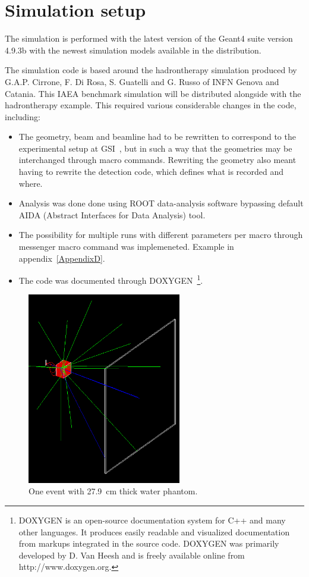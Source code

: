 \section{Simulation setup\label{SimulationSetup}} %
The simulation is performed with the latest version of the Geant4 suite version 4.9.3b with the newest simulation models available in the distribution.

The simulation code is based around the hadrontherapy simulation produced by G.A.P. Cirrone, F. Di Rosa, S. Guatelli and  G. Russo of INFN Genova and Catania. This IAEA benchmark simulation will be distributed alongside with the hadrontherapy example. This required various considerable changes in the code, including:
\begin{itemize}
\item The geometry, beam and beamline had to be rewritten to correspond to the experimental setup at GSI~\cite{ehaettner}, but in such a way that the geometries may be interchanged through macro commands. Rewriting the geometry also meant having to rewrite the detection code, which defines what is recorded and where.
\item Analysis was done done using ROOT data-analysis software bypassing default AIDA (Abstract Interfaces for Data Analysis) tool.
\item The possibility for multiple runs with different parameters per macro through messenger macro command was implemeneted. Example in appendix~\ref{AppendixD}.
\item The code was documented through DOXYGEN~\footnote{DOXYGEN is an open-source documentation system for C++ and many other languages. It produces easily readable and visualized documentation from markups integrated in the source code. DOXYGEN was primarily developed by D. Van Heesh and is freely available online from http://www.doxygen.org.}.
\end{itemize}


\begin{figure}[h] 
\begin{center}
\includegraphics[width=0.6\textwidth]{images/oneEvent.png}  
\caption{\label{fig:oneEvent} One event with 27.9~cm thick water phantom.}
\end{center}
\end{figure}

